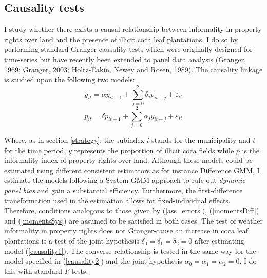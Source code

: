 \documentclass[a4paper, 12pt]{article}
\begin{document}
\subsection{Causality tests}
\label{causalitytests}

I study whether there exists a causal relationship between informality in property rights over land and the presence of illicit coca leaf plantations. I do so by performing standard Granger causality tests which were originally designed for time-series but have recently been extended to panel data analysis (Granger, 1969; Granger, 2003; Holtz-Eakin, Newey and Rosen, 1989). The causality linkage is studied upon the following two models:
\begin{equation}
\label{causality1}
y_{it}=\alpha y_{it-1}+\sum\limits_{j=0}^{2} \delta_j p_{it-j} + \varepsilon_{it}
\end{equation}
\begin{equation}
\label{causality2}
p_{it}=\delta p_{it-1}+\sum\limits_{j=0}^{2} \alpha_j y_{it-j} + \varepsilon_{it}
\end{equation}

Where, as in section \ref{strategy}, the subindex $i$ stands for the municipality and $t$ for the time period, $y$ represents the proportion of illicit coca fields while $p$ is the informality index of property rights over land. Although these models could be estimated using different consistent estimators as for instance Difference GMM, I estimate the models following a System GMM approach to rule out \emph{dynamic panel bias} and gain a substantial efficiency. Furthermore, the first-difference transformation used in the estimation allows for fixed-individual effects. Therefore, conditions analogous to those given by (\ref{ass_errors}), (\ref{momentsDiff}) and (\ref{momentsSys}) are assumed to be satisfied in both cases. The test of weather informality in property rights does not Granger-cause an increase in coca leaf plantations is a test of the joint hypothesis $\delta_0=\delta_1=\delta_2=0$ after estimating model (\ref{causality1}). The converse relationship is tested in the same way for the model specified in (\ref{causality2}) and the joint hypothesis $\alpha_0=\alpha_1=\alpha_2=0$. I do this with standard $F$-tests.
\end{document}
